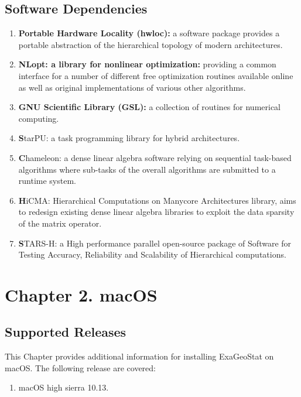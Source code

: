 \documentclass[
10pt, %
a4paper, %
oneside, %
headinclude,footinclude, %
BCOR5mm, %
]{scrartcl}
\begin{document}
\subsection{Software Dependencies }
\begin{enumerate}
\item {\textbf {Portable Hardware Locality (hwloc):}} a software package provides a portable abstraction of the hierarchical topology of modern architectures.
\item {\textbf {NLopt: a library for nonlinear optimization:}} providing a common interface for a number of different free optimization routines available online as well as original implementations of various other algorithms.
\item {\textbf {GNU Scientific Library (GSL):}} a collection of routines for numerical computing.
\item {{\textbf StarPU:}} a task programming library for hybrid architectures.
\item {{\textbf Chameleon:}} a dense linear algebra software relying on sequential task-based algorithms where sub-tasks of the overall algorithms are submitted to a runtime system.
\item {{\textbf HiCMA:}} Hierarchical Computations on Manycore Architectures library, aims to redesign existing dense linear algebra libraries to exploit the data sparsity of the matrix operator.
\item {{\textbf STARS-H:}} a High performance parallel open-source package of Software for Testing Accuracy, Reliability and Scalability of Hierarchical computations.
\end{enumerate}


\newpage

\section{Chapter 2. macOS}
\subsection{Supported  Releases}
This Chapter provides additional information for installing ExaGeoStat on macOS.
The following release are covered:
\begin{enumerate}
\item macOS high sierra 10.13.
\end{enumerate}
\end{document}
